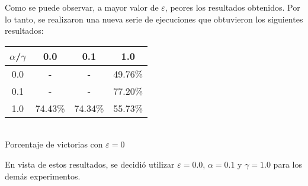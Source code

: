 Como se puede observar, a mayor valor de $\varepsilon$, peores los resultados obtenidos. Por lo tanto, se realizaron una nueva serie de ejecuciones que obtuvieron los siguientes resultados:
\begin{center}
\begin{tabular}{|c||c|c|c|}
	\hline
	$\alpha$/$\gamma$& 0.0 & 0.1 & 1.0\\
	\hline
	\hline
	0.0 & - & - & 49.76\%\\
	\hline
	0.1 & - & - & \cellcolor{intvier}77.20\%\\
	\hline
	1.0 & 74.43\% & 74.34\% & 55.73\%\\
	\hline
\end{tabular}\\
Porcentaje de victorias con $\varepsilon=0$
\end{center}

En vista de estos resultados, se decidi\'o utilizar $\varepsilon = 0.0$, $\alpha = 0.1$ y $\gamma = 1.0$ para los dem\'as experimentos.






